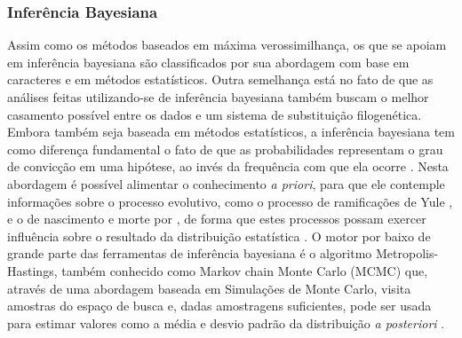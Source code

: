 \documentclass[english,brazilian]{UNISINOSmonografia} %
\begin{document}
\subsubsection{Inferência Bayesiana}


Assim como os métodos baseados em máxima verossimilhança, os que se apoiam em inferência bayesiana são classificados por sua abordagem com base em caracteres e em métodos estatísticos.
Outra semelhança está no fato de que as análises feitas utilizando-se de inferência bayesiana também buscam o melhor casamento possível entre os dados e um sistema de substituição filogenética.
Embora também seja baseada em métodos estatísticos, a inferência bayesiana tem como diferença fundamental o fato de que as probabilidades representam o grau de convicção em uma hipótese, ao invés da frequência com que ela ocorre \cite{Keane2006a}.
Nesta abordagem é possível alimentar o conhecimento \textit{a priori}, para que ele contemple informações sobre o processo evolutivo, como o processo de ramificações de Yule \cite{Edwards1970}, e o de nascimento e morte por , de forma que estes processos possam exercer influência sobre o resultado da distribuição estatística \cite{yang2014molecular}.
O motor por baixo de grande parte das ferramentas de inferência bayesiana é o 
algoritmo Metropolis-Hastings, também conhecido como Markov chain Monte Carlo (MCMC) que, através de uma abordagem baseada em Simulações de Monte Carlo, visita amostras do espaço de busca e, dadas amostragens suficientes, pode ser usada para estimar valores como a média e desvio padrão da distribuição \textit{a posteriori} \cite{Nascimento2017}.


\end{document}
